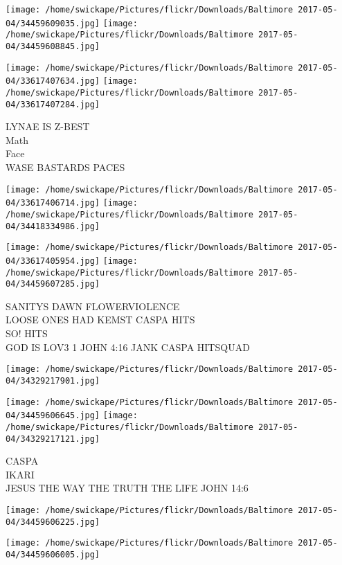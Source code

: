 \documentclass[10pt,letterpaper]{article}
\begin{document}
\texttt{[image: /home/swickape/Pictures/flickr/Downloads/Baltimore 2017-05-04/34459609035.jpg]}
\texttt{[image: /home/swickape/Pictures/flickr/Downloads/Baltimore 2017-05-04/34459608845.jpg]}

\texttt{[image: /home/swickape/Pictures/flickr/Downloads/Baltimore 2017-05-04/33617407634.jpg]}
\texttt{[image: /home/swickape/Pictures/flickr/Downloads/Baltimore 2017-05-04/33617407284.jpg]}

LYNAE IS Z{-}BEST\\
Math\\
Face\\
WASE BASTARDS PACES\\
\pagebreak

\texttt{[image: /home/swickape/Pictures/flickr/Downloads/Baltimore 2017-05-04/33617406714.jpg]}
\texttt{[image: /home/swickape/Pictures/flickr/Downloads/Baltimore 2017-05-04/34418334986.jpg]}

\texttt{[image: /home/swickape/Pictures/flickr/Downloads/Baltimore 2017-05-04/33617405954.jpg]}
\texttt{[image: /home/swickape/Pictures/flickr/Downloads/Baltimore 2017-05-04/34459607285.jpg]}

SANITYS DAWN FLOWERVIOLENCE\\
LOOSE ONES HAD KEMST CASPA HITS\\
SO!  HITS\\
GOD IS LOV3 1 JOHN 4:16 JANK CASPA HITSQUAD\\
\pagebreak

\texttt{[image: /home/swickape/Pictures/flickr/Downloads/Baltimore 2017-05-04/34329217901.jpg]}

\vspace{0.25in}
\texttt{[image: /home/swickape/Pictures/flickr/Downloads/Baltimore 2017-05-04/34459606645.jpg]}
\texttt{[image: /home/swickape/Pictures/flickr/Downloads/Baltimore 2017-05-04/34329217121.jpg]}

CASPA\\
IKARI\\
JESUS THE WAY THE TRUTH THE LIFE JOHN 14:6\\
\pagebreak

\texttt{[image: /home/swickape/Pictures/flickr/Downloads/Baltimore 2017-05-04/34459606225.jpg]}

\vspace{0.25in}
\texttt{[image: /home/swickape/Pictures/flickr/Downloads/Baltimore 2017-05-04/34459606005.jpg]}
\end{document}
